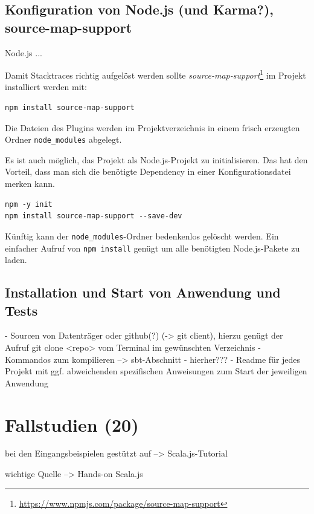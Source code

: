 \documentclass[a4paper, 12pt, hidelinks, listof=totoc, listoftables=totoc, bibliography=totoc]{scrreprt}
\begin{document}
\section{Konfiguration von Node.js (und Karma?), source-map-support}

Node.js ...

Damit Stacktraces richtig aufgelöst werden sollte \textit{source-map-support}\footnote{\url{https://www.npmjs.com/package/source-map-support}} im Projekt installiert werden mit:

\begin{lstlisting}
npm install source-map-support
\end{lstlisting}

Die Dateien des Plugins werden im Projektverzeichnis in einem frisch erzeugten Ordner \texttt{node\_modules} abgelegt.

Es ist auch möglich, das Projekt als Node.js-Projekt zu initialisieren. Das hat den Vorteil, dass man sich die benötigte Dependency in einer Konfigurationsdatei merken kann.

\begin{lstlisting}
npm -y init
npm install source-map-support --save-dev
\end{lstlisting}

Künftig kann der \texttt{node\_modules}-Ordner bedenkenlos gelöscht werden. Ein einfacher Aufruf von \texttt{npm install} genügt um alle benötigten Node.js-Pakete zu laden.


\section{Installation und Start von Anwendung und Tests}

- Sourcen von Datenträger oder github(?) (-> git client), hierzu genügt der Aufruf git clone <repo> vom Terminal im gewünschten Verzeichnis
- Kommandos zum kompilieren --> sbt-Abschnitt - hierher???
- Readme für jedes Projekt mit ggf. abweichenden spezifischen Anweisungen zum Start der jeweiligen Anwendung


\chapter{Fallstudien (20)}

bei den Eingangsbeispielen gestützt auf
-->  Scala.js-Tutorial

wichtige Quelle
-->  Hands-on Scala.js
\end{document}
